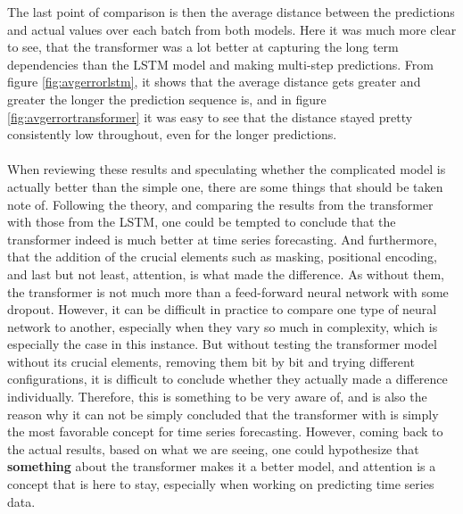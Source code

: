 \documentclass[main.tex]{subfiles}
\begin{document}
The last point of comparison is then the average distance between the predictions and actual values over each batch from both models. Here it was much more clear to see, that the transformer was a lot better at capturing the long term dependencies than the LSTM model and making multi-step predictions. From figure \ref{fig:avgerrorlstm}, it shows that the average distance gets greater and greater the longer the prediction sequence is, and in figure \ref{fig:avgerrortransformer} it was easy to see that the distance stayed pretty consistently low throughout, even for the longer predictions.\\
\\
When reviewing these results and speculating whether the complicated model is actually better than the simple one, there are some things that should be taken note of. Following the theory, and comparing the results from the transformer with those from the LSTM, one could be tempted to conclude that the transformer indeed is much better at time series forecasting. And furthermore, that the addition of the crucial elements such as masking, positional encoding, and last but not least, attention, is what made the difference. As without them, the transformer is not much more than a feed-forward neural network with some dropout. However, it can be difficult in practice to compare one type of neural network to another, especially when they vary so much in complexity, which is especially the case in this instance. But without testing the transformer model without its crucial elements, removing them bit by bit and trying different configurations, it is difficult to conclude whether they actually made a difference individually. Therefore, this is something to be very aware of, and is also the reason why it can not be simply concluded that the transformer with is simply the most favorable concept for time series forecasting. However, coming back to the actual results, based on what we are seeing, one could hypothesize that \textbf{something} about the transformer makes it a better model, and attention is a concept that is here to stay, especially when working on predicting time series data.
\end{document}
